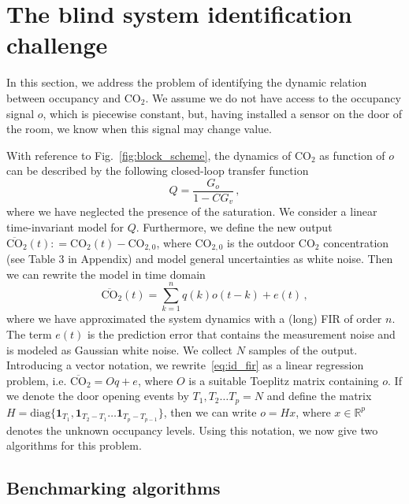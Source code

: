 \documentclass{article}
\begin{document}
\section{The blind system identification challenge}\label{sec:blind_id}
In this section, we address the problem of identifying the dynamic relation between occupancy and CO$_2$. We assume we do not have access to the occupancy signal $o$, which is piecewise constant, but, having installed a sensor on the door of the room, we know when this signal may change value.

With reference to Fig.~\ref{fig:block_scheme}, the dynamics of CO$_2$ as function of $o$ can be described by the following closed-loop transfer function
\begin{equation}
Q = \frac{G_o}{1-C G_v} \,,
\end{equation}
where we have neglected the presence of the saturation. We consider a linear time-invariant model for $Q$. Furthermore, we define the new output $\overline{\textrm{CO}}_2(t) : = \textrm{CO}_2(t) - \textrm{CO}_{2,0}$, where $\textrm{CO}_{2,0}$ is the outdoor CO$_2$ concentration (see Table 3 in Appendix) and model general uncertainties as white noise. Then we can rewrite the model in time domain
\begin{equation}\label{eq:id_fir}
\overline{\textrm{CO}}_2(t) = \sum_{k=1}^n q(k) o(t-k) + e(t) \,,
\end{equation}
where we have approximated the system dynamics with a (long) FIR of order $n$.
The term $e(t)$ is the prediction error that contains the
measurement noise and is modeled as Gaussian white noise.
We collect $N$ samples of the output. Introducing a vector notation, we rewrite~\eqref{eq:id_fir} as a linear regression problem, i.e.
$\overline{\textrm{CO}}_2 = O q + e$, where $O$ is a suitable Toeplitz matrix
containing $o$.
If we denote the door opening events by $T_1,T_2\dots T_p=N$ and define the matrix $ H = \mathrm{diag}\{\mathbf{1}_{T_1},\mathbf{1}_{T_2-T_1}\dots\mathbf{1}_{T_p-T_{p-1}}\}$, then we can write
$o = Hx$, where $x \in \mathbb{R}^p$ denotes the unknown occupancy levels. Using this notation, we now give two algorithms for this problem.
\subsection{Benchmarking algorithms}
\end{document}
